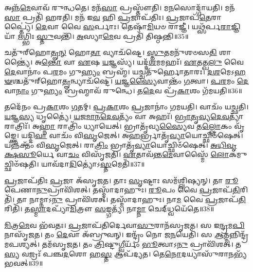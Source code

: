𑌅𑌨𑍍𑌨᳴\-\ul{𑌮𑍇}\-𑌵𑌾𑌵᳴ 𑌰𑍁𑌨𑍍𑌧𑌤𑍇।
𑌮𑌨᳴\-\ul{𑌸𑌾} 𑌪𑍍𑌰𑌸𑍍𑌤𑍗᳴𑌤𑌿।
𑌮\-\ul{𑌨}\-𑌸𑍋𑌦𑍍𑌗𑌾᳴𑌯𑌤𑌿।
𑌮𑌨᳴\-\ul{𑌸𑌾} 𑌪𑍍𑌰𑌤𑌿᳴ 𑌹𑌰𑌤𑌿।
𑌮𑌨᳴ 𑌇\-\ul{𑌵} 𑌹𑌿 \ul{𑌪𑍍𑌰}\-𑌜𑌾\-𑌪᳴𑌤𑌿𑌃।
\-\ul{𑌪𑍍𑌰}\-𑌜𑌾𑌪᳴\-\ul{𑌤𑍇}\-𑌰𑌾𑌪𑍍𑌤𑍍𑌯𑍈॑।
\-\ul{𑌦𑍇}\-𑌵𑌾 𑌵𑍈 \ul{𑌸}\-𑌰𑍍𑌪𑌾𑌃।
𑌤𑍇𑌷𑌾᳴\-\ul{𑌮𑌿}\-𑌯𑍞 𑌰𑌾𑌜𑍍𑌞𑍀॑।
𑌯𑌥𑍍𑌸᳴𑌰𑍍𑌪\-\ul{𑌰𑌾}\-𑌜𑍍𑌞𑌿𑌯𑌾᳴ \ul{𑌋}\-𑌗𑍍𑌭𑌿𑌃 \ul{𑌸𑍍𑌤𑍁}\-𑌵𑌨𑍍𑌤𑌿᳴।
\-\ul{𑌅}\-𑌸𑍍𑌯𑌾\-\ul{𑌮𑍇}\-𑌵 𑌪𑍍𑌰𑌤𑌿᳴ 𑌤𑌿𑌷𑍍𑌠𑌨𑍍𑌤𑌿॥35॥

𑌚𑌤𑍁᳴𑌰𑍍‌\mbox{}𑌹𑍋\-\ul{𑌤𑍄}\-\-\ul{𑌨𑍍} 𑌹𑍋\-\ul{𑌤𑌾} 𑌵𑍍𑌯𑌾𑌚᳴𑌷𑍍𑌟𑍇।
\-\ul{𑌸𑍍𑌤𑍁}\-𑌤𑌮𑌨𑍁᳴𑌶𑍞𑌸\-\ul{𑌤𑌿} 𑌶𑌾𑌨𑍍𑌤𑍍𑌯𑍈॑।
𑌅\-\ul{𑌨𑍍𑌤𑍋} 𑌵𑌾 \ul{𑌏}\-𑌷 \ul{𑌯}\-𑌜𑍍𑌞𑌸𑍍𑌯᳴।
𑌯𑌦𑍍𑌦᳴\-\ul{𑌶}\-𑌮𑌮𑌹𑌃᳴।
\-\ul{𑌏}\-𑌤𑌤𑍍𑌖\-\ul{𑌲𑍁} 𑌵𑍈 \ul{𑌦𑍇}\-𑌵𑌾𑌨𑌾𑌂॑ 𑌪\-\ul{𑌰}\-𑌮𑌂 𑌗𑍁\-\ul{𑌹𑍍𑌯𑌂} 𑌬𑍍𑌰𑌹𑍍𑌮᳴।
𑌯𑌚𑍍𑌚𑌤𑍁᳴𑌰𑍍\mbox{}𑌹𑍋𑌤𑌾𑌰𑌃।
\-\ul{𑌦}\-\-\ul{𑌶}\-𑌮𑍇\-𑌽\-\ul{𑌹}\-\-\ul{𑍟}\-𑌶𑍍𑌚𑌤𑍁᳴𑌰𑍍\-‌𑌹𑍋\-\ul{𑌤𑍄}\-𑌨𑍍𑌵𑍍𑌯𑌾𑌚᳴𑌷𑍍𑌟𑍇।
\-\ul{𑌯}\-𑌜𑍍𑌞\-\ul{𑌸𑍍𑌯𑍈}\-𑌵𑌾𑌨𑍍𑌤𑌂᳴ \ul{𑌗}\-𑌤𑍍𑌵𑌾।
\-\ul{𑌪}\-\-\ul{𑌰}\-𑌮𑌂 \ul{𑌦𑍇}\-𑌵𑌾\-\ul{𑌨𑌾𑌂} 𑌗𑍁\-\ul{𑌹𑍍𑌯𑌂} 𑌬𑍍𑌰𑌹𑍍𑌮𑌾𑌵᳴ 𑌰𑍁𑌨𑍍𑌧𑍇।
𑌤\-\ul{𑌦𑍇}\-𑌵 𑌪𑍍𑌰᳴\-\ul{𑌕𑌾}\-𑌶𑌂 𑌗᳴𑌮𑌯𑌤𑌿॥36॥

𑌤𑌦𑍇᳴𑌨𑌂 𑌪𑍍𑌰\-\ul{𑌕𑌾}\-𑌶𑌂 \ul{𑌗}\-𑌤𑌮𑍍।
\-\ul{𑌪𑍍𑌰}\-\-\ul{𑌕𑌾}\-𑌶𑌂 \ul{𑌪𑍍𑌰}\-𑌜𑌾𑌨𑌾𑌂॑ 𑌗𑌮𑌯𑌤𑌿।
𑌵𑌾𑌚𑌂᳴ 𑌯𑌚𑍍𑌛𑌤𑌿।
\-\ul{𑌯}\-𑌜𑍍𑌞\-\ul{𑌸𑍍𑌯} 𑌧𑍃𑌤𑍍𑌯𑍈॑।
\-\ul{𑌯}\-\-\ul{𑌜}\-\-\ul{𑌮𑌾}\-\-\ul{𑌨}\-\-\ul{𑌦𑍇}\-\-\ul{𑌵}\-𑌤𑍍𑌯𑌂᳴ 𑌵𑌾 𑌅𑌹𑌃᳴।
\-\ul{𑌭𑍍𑌰𑌾}\-\-\ul{𑌤𑍃}\-\-\ul{𑌵𑍍𑌯}\-\-\ul{𑌦𑍇}\-\-\ul{𑌵}\-𑌤𑍍𑌯𑌾᳴ 𑌰𑌾𑌤𑍍𑌰𑌿𑌃᳴।
𑌅\-\ul{𑌹𑍍𑌨𑌾} 𑌰𑌾𑌤𑍍𑌰𑌿𑌂᳴ 𑌧𑍍𑌯𑌾𑌯𑍇𑌤𑍍।
𑌭𑍍𑌰𑌾𑌤𑍃᳴𑌵𑍍𑌯\-\ul{𑌸𑍍𑌯𑍈}\-𑌵 𑌤\-\ul{𑌲𑍍𑌲𑍋}\-𑌕𑌂 𑌵𑍃᳴𑌙𑍍𑌕𑍍𑌤𑍇।
𑌯𑌦𑍍𑌦𑌿\-\ul{𑌵𑌾} 𑌵𑌾𑌚𑌂᳴ 𑌵𑌿\-\ul{𑌸𑍃}\-𑌜𑍇𑌤𑍍।
𑌅\-\ul{𑌹}\-𑌰𑍍𑌭𑍍𑌰𑌾𑌤𑍃᳴\-\ul{𑌵𑍍𑌯𑌾}\-𑌯𑍋𑌚𑍍𑌛𑌿𑍞᳴𑌷𑍇𑌤𑍍।
𑌯𑌨𑍍𑌨𑌕𑍍𑌤𑌂᳴ 𑌵𑌿\-\ul{𑌸𑍃}\-𑌜𑍇𑌤𑍍।
𑌰𑌾\-\ul{𑌤𑍍𑌰𑌿𑌂} 𑌭𑍍𑌰𑌾𑌤𑍃᳴\-\ul{𑌵𑍍𑌯𑌾}\-𑌯𑍋𑌚𑍍𑌛𑌿𑍞᳴𑌷𑍇𑌤𑍍।
\-\ul{𑌅}\-\-\ul{𑌧𑌿}\-\-\ul{𑌵𑍃}\-\-\ul{𑌕𑍍𑌷}\-\-\ul{𑌸𑍂}\-𑌰𑍍𑌯𑍇 𑌵𑌾\-\ul{𑌚𑌂} 𑌵𑌿𑌸𑍃᳴𑌜𑌤𑌿।
\-\ul{𑌏}\-𑌤𑌾𑌵᳴𑌨𑍍𑌤\-\ul{𑌮𑍇}\-𑌵𑌾𑌸𑍍𑌮𑍈᳴ \ul{𑌲𑍋}\-𑌕𑌮𑍁𑌚𑍍𑌛𑌿𑍞᳴𑌷𑌤𑌿।
𑌯𑌾𑌵᳴𑌦𑌾\-\ul{𑌦𑌿}\-𑌤𑍍𑌯𑍋॑\-𑌽\-\ul{𑌸𑍍𑌤}\-𑌮𑍇𑌤𑌿᳴॥37॥\anuvakamend[𑌪𑍃𑌶𑍍𑌞𑌿᳴ 𑌤𑌿𑌷𑍍𑌠𑌨𑍍𑌤𑌿 𑌗𑌮𑌯𑌤𑌿 𑌶𑌿𑍞\-\ul{𑌷𑍇}\-𑌤𑍍𑌪𑌞𑍍𑌚᳴ 𑌚]

\-\ul{𑌪𑍍𑌰}\-𑌜𑌾\-𑌪᳴𑌤𑌿𑌃 \ul{𑌪𑍍𑌰}\-𑌜𑌾 𑌅᳴\-𑌸𑍃𑌜𑌤।
𑌤𑌾𑌃 \ul{𑌸𑍃}\-𑌷𑍍𑌟𑌾𑌃 𑌸𑌮᳴𑌶𑍍𑌲𑌿𑌷𑍍𑌯𑌨𑍍।
𑌤𑌾 \ul{𑌰𑍂}\-𑌪𑍇𑌣𑌾\-\ul{𑌨𑍁}\-𑌪𑍍𑌰𑌾𑌵𑌿᳴𑌶𑌤𑍍।
𑌤𑌸𑍍𑌮𑌾᳴𑌦𑌾𑌹𑍁𑌃।
\-\ul{𑌰𑍂}\-𑌪𑌂 𑌵𑍈 \ul{𑌪𑍍𑌰}\-𑌜𑌾𑌪᳴\-\ul{𑌤𑌿}\-𑌰𑌿𑌤𑌿᳴।
𑌤𑌾 𑌨𑌾𑌮𑍍𑌨𑌾𑌽\-\ul{𑌨𑍁} 𑌪𑍍𑌰𑌾𑌵𑌿᳴𑌶𑌤𑍍।
𑌤𑌸𑍍𑌮𑌾᳴𑌦𑌾𑌹𑍁𑌃।
𑌨𑌾\-\ul{𑌮} 𑌵𑍈 \ul{𑌪𑍍𑌰}\-𑌜𑌾𑌪᳴\-\ul{𑌤𑌿}\-𑌰𑌿𑌤𑌿᳴।
𑌤\-\ul{𑌸𑍍𑌮𑌾}\-𑌦𑌪𑍍𑌯𑌾᳴\-\ul{𑌮𑌿}\-𑌤𑍍𑌰𑍗 \ul{𑌸}\-𑌙𑍍𑌗𑌤𑍍𑌯᳴।
𑌨𑌾\-\ul{𑌮𑍍𑌨𑌾} 𑌚𑍇𑌦𑍍‌𑌧𑍍𑌵𑌯𑍇᳴𑌤𑍇॥38॥

\-\ul{𑌮𑌿}\-𑌤𑍍𑌰\-\ul{𑌮𑍇}\-𑌵 𑌭᳴𑌵𑌤𑌃।
\-\ul{𑌪𑍍𑌰}\-𑌜𑌾𑌪᳴𑌤𑌿𑌰𑍍𑌦𑍇𑌵𑌾\-\ul{𑌸𑍁}\-𑌰𑌾𑌨᳴\-𑌸𑍃𑌜𑌤।
𑌸 𑌇\-\ul{𑌨𑍍𑌦𑍍𑌰}\-𑌮\-\ul{𑌪𑌿} 𑌨𑌾𑌸𑍃᳴𑌜𑌤।
𑌤𑌂 \ul{𑌦𑍇}\-𑌵𑌾 𑌅᳴𑌬𑍍𑌰𑍁𑌵𑌨𑍍।
𑌇𑌨𑍍𑌦𑍍𑌰𑌂᳴ 𑌨𑍋 𑌜\-\ul{𑌨}\-𑌯𑍇𑌤𑌿᳴।
𑌸 \ul{𑌆}\-𑌤𑍍𑌮𑌨𑍍𑌨𑌿𑌨𑍍𑌦𑍍𑌰᳴𑌮𑌪𑌶𑍍𑌯𑌤𑍍।
𑌤𑌮᳴\-𑌸𑍃𑌜𑌤।
𑌤𑌂 \ul{𑌤𑍍𑌰𑌿}\-𑌷𑍍𑌟𑍁\-\ul{𑌗𑍍𑌵𑍀}\-𑌰𑍍𑌯𑌂᳴ \ul{𑌭𑍂}\-𑌤𑍍𑌵𑌾𑌽\-\ul{𑌨𑍁} 𑌪𑍍𑌰𑌾𑌵𑌿᳴𑌶𑌤𑍍।
𑌤\-\ul{𑌸𑍍𑌯} 𑌵𑌜𑍍𑌰𑌃᳴ 𑌪𑌞𑍍𑌚\-\ul{𑌦}\-𑌶𑍋 𑌹\-\ul{𑌸𑍍𑌤} 𑌆𑌪᳴𑌦𑍍𑌯𑌤।
𑌤𑍇\-\ul{𑌨𑍋}\-𑌦𑌯𑍍𑌯𑌾𑌸𑍁᳴𑌰𑌾\-\ul{𑌨}\-𑌭𑍍𑌯᳴𑌭𑌵𑌤𑍍॥39॥

